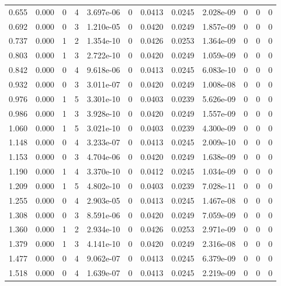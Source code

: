 \documentclass[preview]{standalone}
\begin{document}
{{\begin{tabular}{L{1.2cm}C{1.2cm} C{0.3cm}C{0.5cm} C{1.4cm}C{1.4cm} C{1.4cm}C{1.4cm} C{1.6cm}C{1.6cm} C{1.6cm}C{1.6cm}}
  0.655  &  0.000  & 0     &  4 &  3.697e-06  & 0  &  0.0413&   0.0245& 2.028e-09 & 0   &  0 & 0  \\ 
  0.692  &  0.000  & 0     &  3 &  1.210e-05  & 0  &  0.0420&   0.0249& 1.857e-09 & 0   &  0 & 0  \\ 
  0.737  &  0.000  & 1     &  2 &  1.354e-10  & 0  &  0.0426&   0.0253& 1.364e-09 & 0   &  0 & 0  \\ 
  0.803  &  0.000  & 1     &  3 &  2.722e-10  & 0  &  0.0420&   0.0249& 1.059e-09 & 0   &  0 & 0  \\ 
  0.842  &  0.000  & 0     &  4 &  9.618e-06  & 0  &  0.0413&   0.0245& 6.083e-10 & 0   &  0 & 0  \\ 
  0.932  &  0.000  & 0     &  3 &  3.011e-07  & 0  &  0.0420&   0.0249& 1.008e-08 & 0   &  0 & 0  \\ 
  0.976  &  0.000  & 1     &  5 &  3.301e-10  & 0  &  0.0403&   0.0239& 5.626e-09 & 0   &  0 & 0  \\ 
  0.986  &  0.000  & 1     &  3 &  3.928e-10  & 0  &  0.0420&   0.0249& 1.557e-09 & 0   &  0 & 0  \\ 
  1.060  &  0.000  & 1     &  5 &  3.021e-10  & 0  &  0.0403&   0.0239& 4.300e-09 & 0   &  0 & 0  \\ 
  1.148  &  0.000  & 0     &  4 &  3.233e-07  & 0  &  0.0413&   0.0245& 2.009e-10 & 0   &  0 & 0  \\ 
  1.153  &  0.000  & 0     &  3 &  4.704e-06  & 0  &  0.0420&   0.0249& 1.638e-09 & 0   &  0 & 0  \\ 
  1.190  &  0.000  & 1     &  4 &  3.370e-10  & 0  &  0.0412&   0.0245& 1.034e-09 & 0   &  0 & 0  \\ 
  1.209  &  0.000  & 1     &  5 &  4.802e-10  & 0  &  0.0403&   0.0239& 7.028e-11 & 0   &  0 & 0  \\ 
  1.255  &  0.000  & 0     &  4 &  2.903e-05  & 0  &  0.0413&   0.0245& 1.467e-08 & 0   &  0 & 0  \\ 
  1.308  &  0.000  & 0     &  3 &  8.591e-06  & 0  &  0.0420&   0.0249& 7.059e-09 & 0   &  0 & 0  \\ 
  1.360  &  0.000  & 1     &  2 &  2.934e-10  & 0  &  0.0426&   0.0253& 2.971e-09 & 0   &  0 & 0  \\ 
  1.379  &  0.000  & 1     &  3 &  4.141e-10  & 0  &  0.0420&   0.0249& 2.316e-08 & 0   &  0 & 0  \\ 
  1.477  &  0.000  & 0     &  4 &  9.062e-07  & 0  &  0.0413&   0.0245& 6.379e-09 & 0   &  0 & 0  \\ 
  1.518  &  0.000  & 0     &  4 &  1.639e-07  & 0  &  0.0413&   0.0245& 2.219e-09 & 0   &  0 & 0  \\ 

\end{tabular}}}
\end{document}
